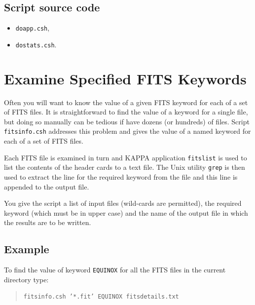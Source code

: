 \documentclass[twoside,11pt]{article}
\newcommand{\htmladdnormallink}[2]{#1}
\newcommand{\xref}[3]{#1}
\newcommand{\xlabel}[1]{}
\begin{document}
\begin{htmlonly}

\subsection*{Script source code}

\begin{itemize}

  \item \htmladdnormallink{{\tt doapp.csh}}{doapp.lis},

  \item \htmladdnormallink{{\tt dostats.csh}}{dostats.lis}.

\end{itemize}

\end{htmlonly}


\newpage
\section{\xlabel{FITSINFO}\label{FITSINFO}Examine Specified FITS Keywords}

Often you will want to know the value of a given FITS keyword for each
of a set of FITS files. It is straightforward to find the value of a
keyword for a single file, but doing so manually can be tedious if have
dozens (or hundreds) of files.  Script {\tt fitsinfo.csh} addresses this
problem and gives the value of a named keyword for each of a set of FITS
files.

Each FITS file is examined in turn and  \xref{KAPPA}{sun95}{} application
\xref{{\tt fitslist}}{sun95}{FITSLIST} is used to list the contents of
the header cards to a text file.  The Unix utility {\tt grep} is then
used to extract the line for the required keyword from the file and
this line is appended to the output file.

You give the script a list of input files (wild-cards are permitted),
the required keyword (which must be in upper case) and the name of the
output file in which the results are to be written.  

\subsection*{Example}

To find the value of keyword {\tt EQUINOX} for all the FITS files in
the current directory type:

\begin{quote}
{\tt fitsinfo.csh '*.fit' EQUINOX fitsdetails.txt}
\end{quote}
\end{document}
